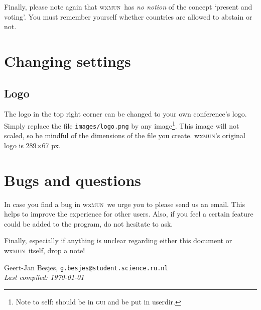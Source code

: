 \documentclass[11pt, a4paper]{article}
\newcommand\wxMUN{wx\textsc{mun}}
\begin{document}
Finally, please note again that \wxMUN\ has \emph{no notion} of the concept `present and voting'. You must remember yourself whether countries are allowed to abstain or not.

\section{Changing settings}
\subsection{Logo}
The logo in the top right corner can be changed to your own conference's logo. Simply replace the file \texttt{images/logo.png} by any image\footnote{Note to self: should be in \textsc{gui} and be put in userdir.}. This image will not scaled, so be mindful of the dimensions of the file you create. \wxMUN 's original logo is 289$\times$67 px.

\section{Bugs and questions}
In case you find a bug in \wxMUN\, we urge you to please send us an email. This helps to improve the experience for other users. Also, if you feel a certain feature could be added to the program, do not hesitate to ask. 

Finally, especially if anything is unclear regarding either this document or \wxMUN\ itself, drop a note!

\vfill
\noindent 
Geert-Jan Besjes, \texttt{g.besjes@student.science.ru.nl} \label{email} \\
\emph{Last compiled: \today}
\end{document}
